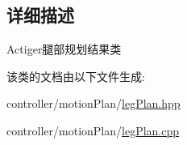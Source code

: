 \subsection{详细描述}
Actiger腿部规划结果类 

该类的文档由以下文件生成\+:\begin{DoxyCompactItemize}
\item 
controller/motion\+Plan/\hyperlink{legPlan_8hpp}{leg\+Plan.\+hpp}\item 
controller/motion\+Plan/\hyperlink{legPlan_8cpp}{leg\+Plan.\+cpp}\end{DoxyCompactItemize}
